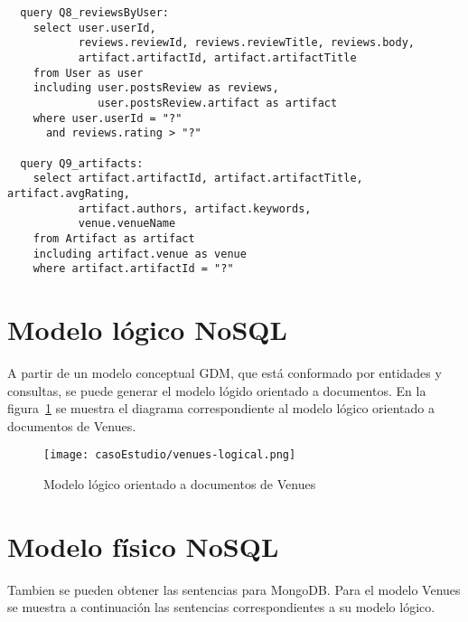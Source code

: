 \begin{verbatim}
  query Q8_reviewsByUser:
    select user.userId,
           reviews.reviewId, reviews.reviewTitle, reviews.body,
           artifact.artifactId, artifact.artifactTitle
    from User as user
    including user.postsReview as reviews,
              user.postsReview.artifact as artifact
    where user.userId = "?"
      and reviews.rating > "?"
  
  query Q9_artifacts:
    select artifact.artifactId, artifact.artifactTitle, artifact.avgRating,
           artifact.authors, artifact.keywords,
           venue.venueName
    from Artifact as artifact
    including artifact.venue as venue
    where artifact.artifactId = "?"
\end{verbatim}

\section{Modelo lógico NoSQL}

A partir de un modelo conceptual GDM, que está conformado por entidades y consultas, se puede generar el modelo lógido orientado a documentos. En la figura~\ref{img:venues-logical} se muestra el diagrama correspondiente al modelo lógico orientado a documentos de Venues.

\begin{figure}[H]
    \centering
    \texttt{[image: casoEstudio/venues-logical.png]}
    \caption{Modelo lógico orientado a documentos de Venues}
    \label{img:venues-logical}
\end{figure}

\section{Modelo físico NoSQL}

Tambien se pueden obtener las sentencias para MongoDB. Para el modelo Venues se muestra a continuación las sentencias correspondientes a su modelo lógico.

